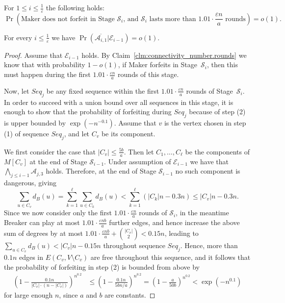 \documentclass[10pt,a4paper]{amsart}
\newcommand{\Prob}{\operatorname{Pr}}
\begin{document}
\begin{claim}\label{clm:connectivity_number.rounds}
For $1 \leq i\leq \frac{1}{\varepsilon}$
the following holds:
$$
\Prob\left(\text{Maker does not forfeit in Stage $\mathcal{S}_i$, and $\mathcal{S}_i$ lasts more than $1.01\cdot \frac{\varepsilon n}{a}$ rounds} \right) = o(1).
$$
\end{claim}

\begin{claim}\label{claim:Ai1}
For every $i\leq \frac{1}{\varepsilon}$ we have
$\Prob(\overline{\mathcal{A}_{i,1}}|\mathcal{E}_{i-1})
=o(1)$.
\end{claim}

\begin{proof}
Assume that $\mathcal{E}_{i-1}$ holds.
By Claim~\ref{clm:connectivity_number.rounds}
we know that
with probability $1-o(1)$,
if Maker forfeits in Stage~$\mathcal{S}_{i}$,
then this must happen during the first 
$1.01\cdot \frac{\varepsilon n}{a}$ rounds of this stage. 

Now, let $Seq_j$ be any fixed sequence within the first 
$1.01\cdot \frac{\varepsilon n}{a}$ rounds
of Stage~$\mathcal{S}_{i}$. 
In order to succeed with a union bound over all
sequences in this stage, it is enough to show
that the probability of forfeiting during $Seq_j$ because of step (2) is upper bounded by $\exp(-n^{-0.1})$. Assume that $v$ is the vertex chosen in step (1) of sequence $Seq_j$, and let $C_v$ be its component. 

We first consider the case that $|C_v|\leq \frac{5b}{a}$. Then
let $C_1,\ldots,C_{\ell}$ be the components of $M[C_v]$
at the end of Stage $\mathcal{S}_{i-1}$.
Under assumption of $\mathcal{E}_{i-1}$
we have that $\bigwedge_{j\leq i-1} \mathcal{A}_{j,3}$
holds. Therefore, at the end of Stage $\mathcal{S}_{i-1}$ no such component
is dangerous, giving
$$
\sum_{u\in C_v} d_B(u)
=
\sum_{k=1}^{\ell} \sum_{u\in C_k} d_B(u)
<
\sum_{k=1}^{\ell} (|C_k|n - 0.3n)
\leq
|C_v|n - 0.3n.
$$ 
Since we now consider only the first $1.01\cdot \frac{\varepsilon n}{a}$ rounds of $\mathcal{S}_{i}$,
in the meantime Breaker can play at most
$1.01\cdot \frac{\varepsilon nb}{a}$ further edges, and hence increase the above sum of degrees by at most
$1.01\cdot \frac{\varepsilon nb}{a} + \binom{|C_v|}{2}<0.15n$, leading to
$
\sum_{u\in C_v} d_B(u)
<
|C_v|n - 0.15n
$
throughout sequence $Seq_j$.
Hence, more than $0.1n$ edges in $E(C_v,V\setminus C_v)$ are free throughout this sequence, and it follows
that the probability of forfeiting in step (2) is bounded from above by
\begin{align*}
\left( 1 - \frac{0.1n}{|C_v|\cdot (n-|C_v|)} \right)^{n^{0.2}}
& \leq 
\left( 1 - \frac{0.1n}{5bn/a} \right)^{n^{0.2}} 
=
\left( 1 - \frac{a}{50b} \right)^{n^{0.2}} 
<
\exp\left( - n^{0.1}\right)
\end{align*}
for large enough $n$, since $a$ and $b$ are constants.


\end{proof}
\end{document}
